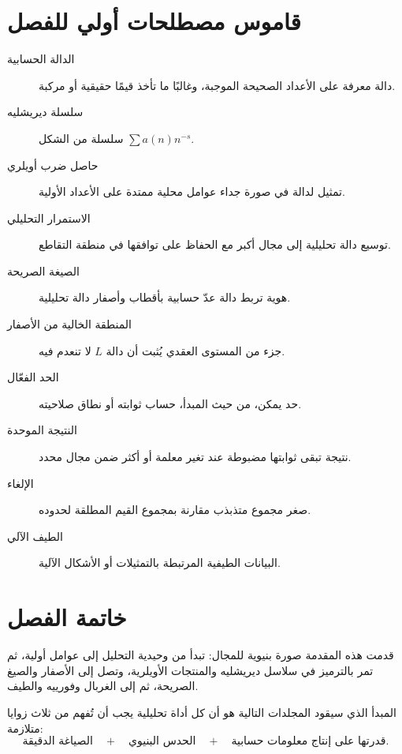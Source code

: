 \section{قاموس مصطلحات أولي للفصل}

\begin{description}
  \item[الدالة الحسابية] دالة معرفة على الأعداد الصحيحة الموجبة، وغالبًا ما تأخذ قيمًا حقيقية أو مركبة.
  \item[سلسلة ديريشليه] سلسلة من الشكل \(\sum a(n)n^{-s}\).
  \item[حاصل ضرب أويلري] تمثيل لدالة في صورة جداء عوامل محلية ممتدة على الأعداد الأولية.
  \item[الاستمرار التحليلي] توسيع دالة تحليلية إلى مجال أكبر مع الحفاظ على توافقها في منطقة التقاطع.
  \item[الصيغة الصريحة] هوية تربط دالة عدّ حسابية بأقطاب وأصفار دالة تحليلية.
  \item[المنطقة الخالية من الأصفار] جزء من المستوى العقدي يُثبت أن دالة \(L\) لا تنعدم فيه.
  \item[الحد الفعّال] حد يمكن، من حيث المبدأ، حساب ثوابته أو نطاق صلاحيته.
  \item[النتيجة الموحدة] نتيجة تبقى ثوابتها مضبوطة عند تغير معلمة أو أكثر ضمن مجال محدد.
  \item[الإلغاء] صغر مجموع متذبذب مقارنة بمجموع القيم المطلقة لحدوده.
  \item[الطيف الآلي] البيانات الطيفية المرتبطة بالتمثيلات أو الأشكال الآلية.
\end{description}

\section{خاتمة الفصل}

قدمت هذه المقدمة صورة بنيوية للمجال: تبدأ من وحيدية التحليل إلى عوامل أولية، ثم تمر بالترميز في سلاسل ديريشليه والمنتجات الأويلرية، وتصل إلى الأصفار والصيغ الصريحة، ثم إلى الغربال وفورييه والطيف.

المبدأ الذي سيقود المجلدات التالية هو أن كل أداة تحليلية يجب أن تُفهم من ثلاث زوايا متلازمة:
\[
\text{الصياغة الدقيقة}
\quad+\quad
\text{الحدس البنيوي}
\quad+\quad
\text{قدرتها على إنتاج معلومات حسابية}.
\]
